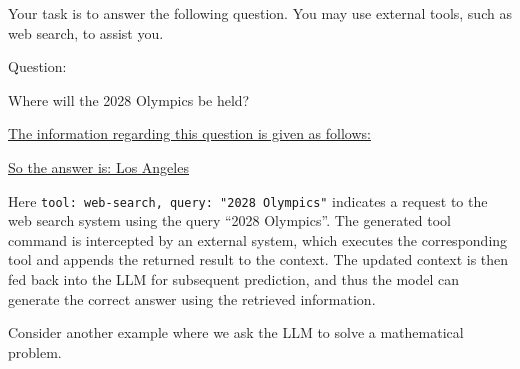 \vspace{0.5em}
\begin{tcolorbox}

\begingroup
\setlength{\leftskip}{2em}
\setlength{\rightskip}{2em}

Your task is to answer the following question. You may use external tools, such as web search, to assist you.

\vspace{0.5em}

Question:

\vspace{0.2em}

Where will the 2028 Olympics be held?

\vspace{0.5em}

\underline{The information regarding this question is given as follows:}

\vspace{0.2em}

\underline{}

\vspace{0.2em}

\underline{So the answer is: Los Angeles}

\endgroup

\end{tcolorbox}
\vspace{0.5em}

\noindent Here \texttt{{tool: web-search, query: "2028 Olympics"}} indicates a request to the web search system using the query ``2028 Olympics''. The generated tool command is intercepted by an external system, which executes the corresponding tool and appends the returned result to the context. The updated context is then fed back into the LLM for subsequent prediction, and thus the model can generate the correct answer using the retrieved information.

Consider another example where we ask the LLM to solve a mathematical problem.

